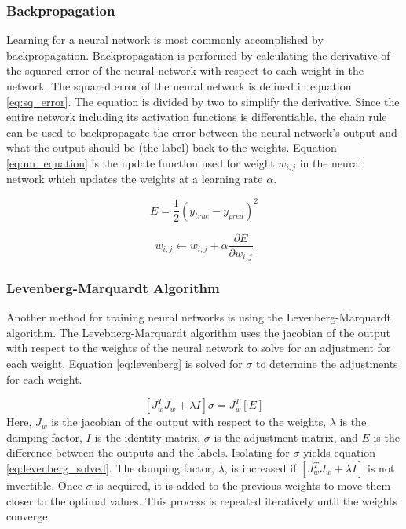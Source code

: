 \documentclass[letterpaper,12pt]{article}
\newcommand{\di}{\partial}
\begin{document}
\subsubsection{Backpropagation}
Learning for a neural network is most commonly accomplished by backpropagation. Backpropagation is performed by calculating the derivative of the squared error of the neural network with respect to each weight in the network. The squared error of the neural network is defined in equation \ref{eq:sq_error}. The equation is divided by two to simplify the derivative. Since the entire network including its activation functions is differentiable, the chain rule can be used to backpropagate the error between the neural network's output and what the output should be (the label) back to the weights. Equation \ref{eq:nn_equation} is the update function used for weight $w_{i,j}$ in the neural network which updates the weights at a learning rate $\alpha$.

\begin{equation}
	\label{eq:sq_error}
	E = \frac{1}{2}(y_{true} - y_{pred})^2
\end{equation}

\begin{equation}
	\label{eq:nn_equation}
	w_{i, j} \leftarrow w_{i,j} + \alpha \frac{\di E}{\di w_{i, j}}
\end{equation}

\subsubsection{Levenberg-Marquardt Algorithm}\label{sec:levenberg}
Another method for training neural networks is using the Levenberg-Marquardt algorithm. The Levebnerg-Marquardt algorithm uses the jacobian of the output with respect to the weights of the neural network to solve for an adjustment for each weight. Equation \ref{eq:levenberg} is solved for $\sigma$ to determine the adjustments for each weight.

\begin{equation}
	\label{eq:levenberg}
	[J_w^T J_w + \lambda I]\sigma = J_w^T [E]
\end{equation}
Here, $J_w$ is the jacobian of the output with respect to the weights, $\lambda$ is the damping factor, $I$ is the identity matrix, $\sigma$ is the adjustment matrix, and $E$ is the difference between the outputs and the labels. Isolating for $\sigma$ yields equation \ref{eq:levenberg_solved}. The damping factor, $\lambda$, is increased if $[J_w^T J_w + \lambda I]$ is not invertible. Once $\sigma$ is acquired, it is added to the previous weights to move them closer to the optimal values. This process is repeated iteratively until the weights converge.
\end{document}
